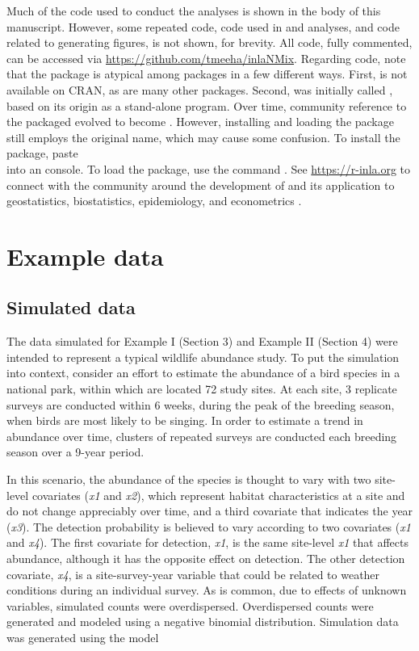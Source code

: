 \documentclass[codesnippet]{jss}
\begin{document}
Much of the code used to conduct the  analyses is shown in the body of this manuscript. However, some repeated  code, code used in  and  analyses, and code related to generating figures, is not shown, for brevity. All code, fully commented, can be accessed via \url{https://github.com/tmeeha/inlaNMix}. Regarding code, note that the  package is atypical among  packages in a few different ways.  First,  is not available on CRAN, as are many other  packages. Second,  was initially called , based on its origin as a stand-alone  program.  Over time, community reference to the packaged evolved to become .  However, installing and loading the package still employs the original name, which may cause some confusion. To install the package, paste  \\into an  console. To load the package, use the  command . See \url{https://r-inla.org} to connect with the community around the development of  and its application to geostatistics, biostatistics, epidemiology, and econometrics \citep{Lindgren_Rue_2015,Blangiardo_Cameletti_2015}.

\section[Example data]{Example data}
\subsection[Simulated data]{Simulated data}
The data simulated for Example I (Section 3) and Example II (Section 4) were intended to represent a typical wildlife abundance study. To put the simulation into context, consider an effort to estimate the abundance of a bird species in a national park, within which are located 72 study sites. At each site, 3 replicate surveys are conducted within 6 weeks, during the peak of the breeding season, when birds are most likely to be singing. In order to estimate a trend in abundance over time, clusters of repeated surveys are conducted each breeding season over a 9-year period.

In this scenario, the abundance of the species is thought to vary with two site-level covariates (\textit{x1} and \textit{x2}), which represent habitat characteristics at a site and do not change appreciably over time, and a third covariate that indicates the year (\textit{x3}). The detection probability is believed to vary according to two covariates (\textit{x1} and \textit{x4}). The first covariate for detection, \textit{x1}, is the same site-level \textit{x1} that affects abundance, although it has the opposite effect on detection. The other detection covariate, \textit{x4}, is a site-survey-year variable that could be related to weather conditions during an individual survey. As is common, due to effects of unknown variables, simulated counts were overdispersed. Overdispersed counts were generated and modeled using a negative binomial distribution. Simulation data was generated using the model
\end{document}
